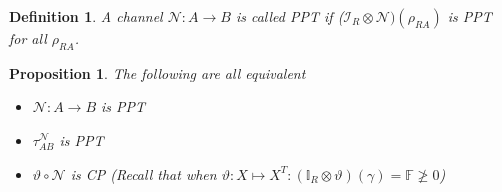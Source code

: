 \documentclass[10pt,oneside,longbibliography]{report}
\newtheorem{proposition}{Proposition}[section]
\newtheorem{definition}{Definition}[section]
\begin{document}
\begin{definition}
A channel $\mathcal{N}: A \rightarrow B$ is called PPT if ($\mathcal{I}_R \otimes \mathcal{N})(\rho_{RA})$ is PPT for all $\rho_{RA}$.
\end{definition}

\begin{proposition}
The following are all equivalent
\begin{itemize}
    \item $\mathcal{N}: A\rightarrow B$ is PPT
    \item $\tau^{\mathcal{N}}_{AB}$ is PPT 
    \item $\vartheta \circ \mathcal{N}$ is CP (Recall that when $\vartheta: X \mapsto X^T: (\mathbb{I}_R \otimes \vartheta)(\gamma)= \mathbb{F} \ngeq 0$)
\end{itemize}
\end{proposition}
{}

\end{document}
